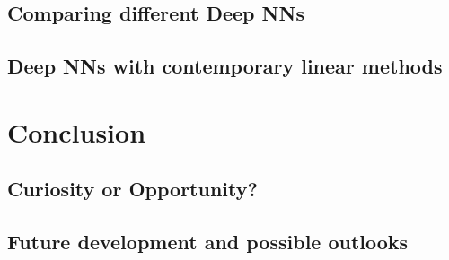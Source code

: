 \subsection{Comparing different Deep NNs}

\subsection{Deep NNs with contemporary linear methods}


\newpage

\section{Conclusion}

\subsection{Curiosity or Opportunity?}

\subsection{Future development and possible outlooks}

